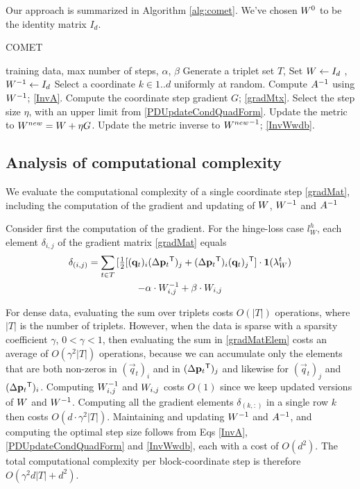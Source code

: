 \documentclass{article}
\begin{document}
Our approach is summarized in Algorithm \ref{alg:comet}. We've chosen ${W}^0$ to be the identity matrix $I_d$.

\begin{algorithm}[tb]
   \caption{COMET}
   \label{alg:comet}
\begin{algorithmic}[1]
    training data, max number of steps, $\alpha$, $\beta$
   \STATE Generate a triplet set $T$, Set  ${W}  \leftarrow I_d$ , ${W}^{-1}  \leftarrow I_d$
   \REPEAT 
   \STATE Select a coordinate $k \in {1..d}$ uniformly at random.
   \STATE Compute $A^{-1}$ using ${W}^{-1}$; \eqref{InvA}.
   \STATE Compute the coordinate step gradient $G$; \eqref{gradMtx}.
   \STATE Select the step size $\eta$, with an upper limit from \eqref{PDUpdateCondQuadForm}.
   \STATE Update the metric to ${{W^{new}}}={W}+\eta G$.
   \STATE Update the metric inverse to ${{W^{new}}}^{-1}$; \eqref{InvWwdb}.
\end{algorithmic}
\end{algorithm}

\subsection{Analysis of computational complexity}
We evaluate the computational complexity of a single coordinate step \eqref{gradMat}, including the computation of the gradient and updating of ${W}$, ${W}^{-1}$ and $A^{-1}$

Consider first the computation of the gradient. For the hinge-loss case $l^{h}_W$, each element $\delta_{i,j}$ of the gradient matrix \eqref{gradMat} equals
\begin{multline}
    \delta_{(i,j)} = \sum\limits_{t\in T}{ [\tfrac{1}{2}[(\mathbf{q}_{t})_i(\Delta\mathbf{p}_{t}{}^\mathsf{T})_j + (\Delta\mathbf{p}_{t}{}^\mathsf{T})_i(\mathbf{q}_{t})_j{}^\mathsf{T}] } \cdot \textbf{1}(\lambda_{W}^t)  \\ 
 - \alpha \cdot {W}^{-1}_{i,j} + \beta \cdot {W}_{i,j}
\label{gradMatElem}
\end{multline}

For dense data, evaluating the sum over triplets costs $O(|T|)$ operations, where $|T|$ is the number of triplets. However, when the  data is sparse with a sparsity coefficient $\gamma$,  $ 0< \gamma <1 $, then evaluating the sum in \eqref{gradMatElem} costs an average of $O(\gamma^2 |T|)$ operations, because we can accumulate only the elements that are both non-zeros in $(\vec{q}_{t})_i$ and in $(\Delta\mathbf{p}_{t}{}^\mathsf{T})_j  $ and likewise for $(\vec{q}_{t})_j$ and $(\Delta\mathbf{p}_{t}{}^\mathsf{T})_i$. Computing ${W}^{-1}_{i,j}$ and ${W}_{i,j}$ costs $O(1)$ since we keep updated versions of ${W}$ and ${W}^{-1}$. Computing all the gradient elements $\delta_{(k,:)}$ in a single row $k$ then costs $O(d\cdot \gamma^2 |T|)$. Maintaining and updating ${W}^{-1}$ and $A^{-1}$, and computing the optimal step size follows from Eqs \ref{InvA}, \ref{PDUpdateCondQuadForm} and \ref{InvWwdb}, each with a cost of $O(d^2)$. The total computational complexity per block-coordinate step is therefore $O(\gamma^2 d |T| + d^2)$.
\end{document}
